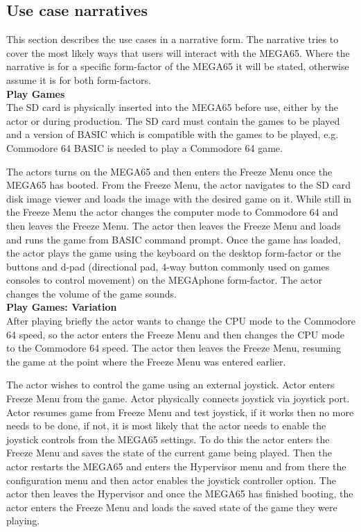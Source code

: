\subsection{Use case narratives}
This section describes the use cases in a narrative form. The narrative tries to cover the most likely ways that users will interact with the MEGA65. Where the narrative is for a specific form-factor of the MEGA65 it will be stated, otherwise assume it is for both form-factors. \\

\textbf{Play Games}\\
The SD card is physically inserted into the MEGA65 before use, either by the actor or during production. The SD card must contain the games to be played and a version of BASIC which is compatible with the games to be played, e.g. Commodore 64 BASIC is needed to play a Commodore 64 game.

The actors turns on the MEGA65 and then enters the Freeze Menu once the MEGA65 has booted. From the Freeze Menu, the actor navigates to the SD card disk image viewer and loads the image with the desired game on it. While still in the Freeze Menu the actor changes the computer mode to Commodore 64 and then leaves the Freeze Menu. The actor then leaves the Freeze Menu and loads and runs the game from BASIC command prompt. Once the game has loaded, the actor plays the game using the keyboard on the desktop form-factor or the buttons and d-pad (directional pad, 4-way button commonly used on games consoles to control movement) on the MEGAphone form-factor. The actor changes the volume of the game sounds.\\

\textbf{Play Games: Variation}\\
After playing briefly the actor wants to change the CPU mode to the Commodore 64 speed, so the actor enters the Freeze Menu and then changes the CPU mode to the Commodore 64 speed. The actor then leaves the Freeze Menu, resuming the game at the point where the Freeze Menu was entered earlier. 

The actor wishes to control the game using an external joystick. Actor enters Freeze Menu from the game. Actor physically connects joystick via joystick port. Actor resumes game from Freeze Menu and test joystick, if it works then no more needs to be done, if not, it is most likely that the actor needs to enable the joystick controls from the MEGA65 settings. To do this the actor enters the Freeze Menu and saves the state of the current game being played. Then the actor restarts the MEGA65 and enters the Hypervisor menu and from there the configuration menu and then actor enables the joystick controller option. The actor then leaves the Hypervisor and once the MEGA65 has finished booting, the actor enters the Freeze Menu and loads the saved state of the game they were playing. 

